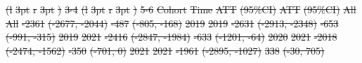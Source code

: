 \documentclass[
  letterpaper,
  DIV=11,
  numbers=noendperiod]{scrartcl}
\providecommand{\DIFdel}[1]{{\protect\color{red}\sout{#1}}}                      %
\providecommand{\DIFdelFL}[1]{\DIFdel{#1}} %
\begin{document}
\DIFdelFL{(l}%
\DIFdelFL{3pt}%
\DIFdelFL{r}%
\DIFdelFL{3pt}%
\DIFdelFL{)}%
\DIFdelFL{3-4}%
\DIFdelFL{(l}%
\DIFdelFL{3pt}%
\DIFdelFL{r}%
\DIFdelFL{3pt}%
\DIFdelFL{)}%
\DIFdelFL{5-6}%
\DIFdelFL{Cohort }%
\DIFdelFL{Time }%
\DIFdelFL{ATT }%
\DIFdelFL{(95\%CI) }%
\DIFdelFL{ATT }%
\DIFdelFL{(95\%CI)}%
\DIFdelFL{All }%
\DIFdelFL{All }%
\DIFdelFL{-2361 }%
\DIFdelFL{(-2677, -2044) }%
\DIFdelFL{-487 }%
\DIFdelFL{(-805, -168)}%
\DIFdelFL{2019 }%
\DIFdelFL{2019 }%
\DIFdelFL{-2631 }%
\DIFdelFL{(-2913, -2348) }%
\DIFdelFL{-653 }%
\DIFdelFL{(-991, -315)}%
\DIFdelFL{2019 }%
\DIFdelFL{2021 }%
\DIFdelFL{-2416 }%
\DIFdelFL{(-2847, -1984) }%
\DIFdelFL{-633 }%
\DIFdelFL{(-1201, -64)}%
\DIFdelFL{2020 }%
\DIFdelFL{2021 }%
\DIFdelFL{-2018 }%
\DIFdelFL{(-2474, -1562) }%
\DIFdelFL{-350 }%
\DIFdelFL{(-701, 0)}%
\DIFdelFL{2021 }%
\DIFdelFL{2021 }%
\DIFdelFL{-1961 }%
\DIFdelFL{(-2895, -1027) }%
\DIFdelFL{338 }%
\DIFdelFL{(-30, 705)}%
\end{document}
